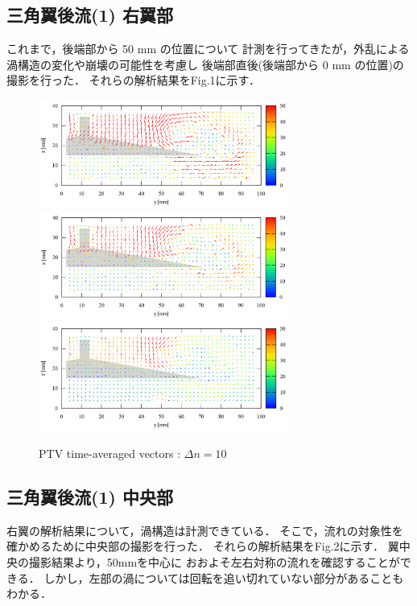 \documentclass[twocolumn,a4j]{jsarticle}
\begin{document}
\newpage
\subsection{三角翼後流(1) 右翼部}
これまで，後端部から 50 mm の位置について
計測を行ってきたが，外乱による渦構造の変化や崩壊の可能性を考慮し
後端部直後(後端部から 0 mm の位置)の撮影を行った．
それらの解析結果をFig.1に示す．

\begin{figure}[htbp]
  \footnotesize
  \begin{center}
    \includegraphics[width=82mm]{../images/right_+0.png}
    \includegraphics[width=82mm]{../images/right_+5.png}
    \includegraphics[width=82mm]{../images/right_+10.png}
  \end{center}
  \caption{PTV time-averaged vectors : $\Delta n = 10$}
\end{figure}

\newpage
\subsection{三角翼後流(1) 中央部}
右翼の解析結果について，渦構造は計測できている．
そこで，流れの対象性を確かめるために中央部の撮影を行った．
それらの解析結果をFig.2に示す．
翼中央の撮影結果より，50mmを中心に
おおよそ左右対称の流れを確認することができる．
しかし，左部の渦については回転を追い切れていない部分があることもわかる．
\end{document}
